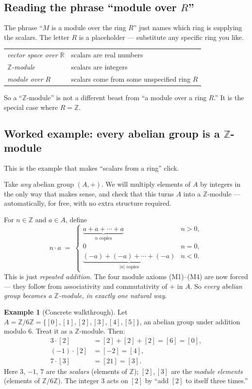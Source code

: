 \documentclass[11pt]{article}
\theoremstyle{definition}
\newtheorem*{ex}{Example}
\begin{document}
\subsection*{Reading the phrase ``module over $R$''}

The phrase ``$M$ is a module over the ring $R$'' just names which ring is supplying
the scalars. The letter $R$ is a placeholder — substitute any specific ring you like.

\begin{center}
\begin{tabular}{ll}
\emph{vector space over $\mathbb{R}$} & scalars are real numbers \\
\emph{$\mathbb{Z}$-module} & scalars are integers \\
\emph{module over $R$} & scalars come from some unspecified ring $R$
\end{tabular}
\end{center}

So a ``$\mathbb{Z}$-module'' is not a different beast from ``a module over a
ring $R$.'' It is the special case where $R = \mathbb{Z}$.

\subsection*{Worked example: every abelian group is a $\mathbb{Z}$-module}

This is the example that makes ``scalars from a ring'' click.

Take \emph{any} abelian group $(A,+)$. We will multiply elements of $A$ by integers
in the only way that makes sense, and check that this turns $A$ into a
$\mathbb{Z}$-module --- automatically, for free, with no extra structure required.

For $n\in\mathbb{Z}$ and $a\in A$, define
\[
n\cdot a \;=\;
\begin{cases}
\underbrace{a + a + \cdots + a}_{n \text{ copies}} & n > 0, \\[4pt]
0 & n = 0, \\[4pt]
\underbrace{(-a) + (-a) + \cdots + (-a)}_{|n| \text{ copies}} & n < 0.
\end{cases}
\]
This is just \emph{repeated addition}. The four module axioms (M1)--(M4) are now
forced — they follow from associativity and commutativity of $+$ in $A$. So
\emph{every abelian group becomes a $\mathbb{Z}$-module, in exactly one natural way}.

\begin{ex}[Concrete walkthrough]
Let $A = \mathbb{Z}/6\mathbb{Z} = \{[0],[1],[2],[3],[4],[5]\}$, an abelian group
under addition modulo $6$. Treat it as a $\mathbb{Z}$-module. Then:
\begin{align*}
3 \cdot [2] &= [2] + [2] + [2] = [6] = [0], \\
(-1) \cdot [2] &= [-2] = [4], \\
7 \cdot [3] &= [21] = [3].
\end{align*}
Here $3$, $-1$, $7$ are the \emph{scalars} (elements of $\mathbb{Z}$); $[2], [3]$
are the \emph{module elements} (elements of $\mathbb{Z}/6\mathbb{Z}$). The integer
$3$ acts on $[2]$ by ``add $[2]$ to itself three times.''
\end{ex}
\end{document}
